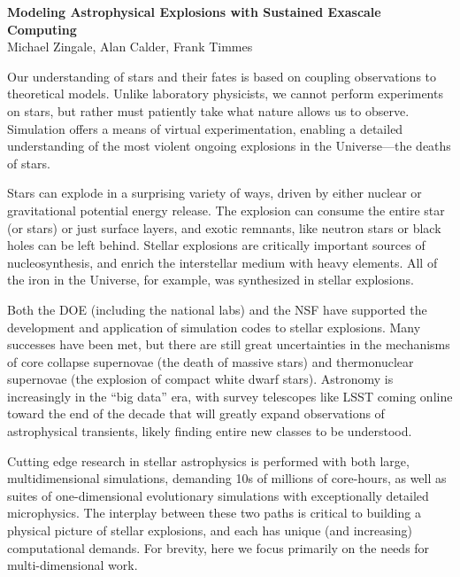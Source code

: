 \documentclass[11pt,twocolumn]{article}
\begin{document}
\thispagestyle{plain}

\begin{center}
{\sffamily \bfseries Modeling Astrophysical Explosions with Sustained 
                     Exascale Computing\footnotemark[1]} \\
{\sffamily\small
Michael Zingale\footnotemark[2], 
Alan Calder\footnotemark[2], 
Frank Timmes\footnotemark[3]
}
\end{center}
%

Our understanding of stars and their fates is based on coupling
observations to theoretical models.  Unlike laboratory physicists, we
cannot perform experiments on stars, but rather must
patiently take what nature allows us to observe.  Simulation offers a means
of virtual experimentation, enabling a detailed understanding of the
most violent ongoing explosions in the Universe---the deaths of stars.

Stars can explode in a surprising variety of ways, driven by either
nuclear or gravitational potential energy release.  The
explosion can consume the entire star (or stars) or just
surface layers, and exotic remnants, like neutron stars or black holes
can be left behind.  Stellar explosions are critically important sources of
nucleosynthesis, and enrich the interstellar medium with heavy elements.
All of the iron in the Universe, for example, was synthesized in
stellar explosions.

Both the DOE (including the national labs) and the
NSF have supported the development and application of simulation codes
to stellar explosions.  Many successes have been met, but there are
still great uncertainties in the mechanisms of core collapse
supernovae (the death of massive stars) and thermonuclear supernovae
(the explosion of compact white dwarf stars).  Astronomy is increasingly
in the ``big data'' era, with survey telescopes
like LSST coming online toward the end of the decade that will greatly
expand observations of astrophysical transients, likely finding entire
new classes to be understood.

Cutting edge research in stellar astrophysics is performed with both
large, multidimensional simulations, demanding 10s of millions of
core-hours, as well as suites of one-dimensional evolutionary
simulations with exceptionally detailed microphysics.  The interplay
between these two paths is critical to building a physical picture
of stellar explosions, and each has unique (and increasing)
computational demands.  For brevity, here we focus primarily on the
needs for multi-dimensional work.
\end{document}
